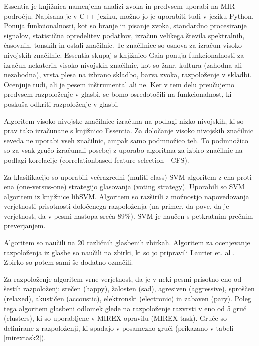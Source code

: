 \documentclass[a4paper, 12pt]{book}
\begin{document}
{Essentia je knjižnica namenjena analizi zvoka in predvsem uporabi na MIR področju. Napisana je v C++ jeziku, možno jo je uporabiti tudi v jeziku Python. Ponuja funkcionalnosti, kot so branje in pisanje zvoka, standardno procesiranje signalov, statistična opredelitev podatkov, izračun velikega števila spektralnih, časovnih, tonskih in ostali značilnic. Te značilnice so osnova za izračun visoko nivojskih značilnic. Essentia skupaj s knjižnico Gaia ponuja funkcionalnosti za izračun nekaterih visoko nivojskih značilnic, kot so žanr, kultura (zahodna ali nezahodna), vrsta plesa na izbrano skladbo, barva zvoka, razpoloženje v skladbi. Ocenjuje tudi, ali je pesem inštrumental ali ne. Ker v tem delu preučujemo predvsem razpoloženje v glasbi, se bomo osredotočili na funkcionalnost, ki poskuša odkriti razpoloženje v glasbi.

Algoritem visoko nivojske značilnice izračuna na podlagi nizko nivojskih, ki so prav tako izračunane s knjižnico Essentia. Za določanje visoko nivojskih značilnic seveda ne uporabi vseh značilnic, ampak samo podmnožico teh. To podmnožico so za vsak gručo izračunali posebej z uporabo algoritma za izbiro značilnic na podlagi korelacije (correlationbased feature selection - CFS). 

Za klasifikacijo so uporabili večrazredni (muliti-class) SVM algoritem z ena proti ena (one-versus-one) strategijo glasovanja (voting strategy). Uporabili so SVM algoritem iz knjižnice libSVM. Algoritem so razširili z možnostjo napovedovanja verjetnosti prisotnosti določenega razpoloženja (na primer, da pove, da je verjetnost, da v pesmi nastopa sreča 89\%). SVM je naučen s petkratnim prečnim preverjanjem.  

Algoritem so naučili na 20 različnih glasbenih zbirkah. Algoritem za ocenjevanje razpoloženja iz glasbe so naučili na zbirki, ki so jo pripravili Laurier et. al \cite{Laurier2009}. Zbirko so potem sami še dodatno označili. 

Za razpoloženje algoritem vrne verjetnost, da je v neki pesmi prisotno eno od šestih razpoloženj: srečen (happy), žalosten (sad), agresiven (aggressive), sproščen (relaxed), akustičen (accoustic), elektronski (electronic) in zabaven (pary). Poleg tega algoritem glasbeni odlomek glede na razpoloženje razvrsti v eno od 5 gruč (clusters), ki so uporabljene v MIREX opravilu (MIREX task). Gruče so definirane z razpoloženji, ki spadajo v posamezno gruči (prikazano v tabeli \ref{mirextask2}). 

}
\end{document}
